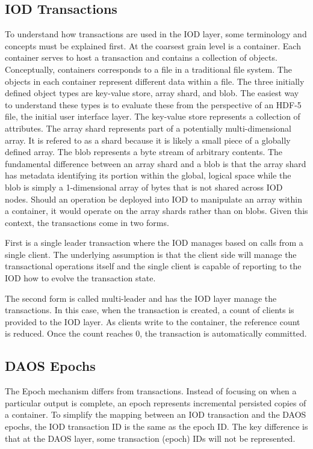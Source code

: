 \documentclass[conference]{sig-alt-gov2}
\begin{document}
\subsection{IOD Transactions}
To understand how transactions are used in the IOD layer, some terminology and
concepts must be explained first. At the coarsest grain level is a container.
Each container serves to host a transaction and contains a collection of
objects. Conceptually, containers corresponds to a file in a traditional file
system. The objects in each container represent different data within a file.
The three initially defined object types are key-value store, array shard,
and blob. The easiest way to understand these types is to evaluate these from
the perspective of an HDF-5 file, the initial user interface layer. The
key-value store represents a collection of attributes. The array shard
represents part of a potentially multi-dimensional array. It is refered to as a
shard because it is likely a small piece of a globally defined array. The blob
represents a byte stream of arbitrary contents.  The fundamental difference
between an array shard and a blob is that the array shard has metadata
identifying its portion within the global, logical space while the blob is
simply a 1-dimensional array of bytes that is not shared across IOD nodes.
Should an operation be deployed into IOD to manipulate an array within a
container, it would operate on the array shards rather than on blobs. Given
this context, the transactions come in two forms.

First is a single leader transaction where the IOD manages based on calls from
a single client. The underlying assumption is that the client side will manage
the transactional operations itself and the single client is capable of
reporting to the IOD how to evolve the transaction state. 

The second form is called multi-leader and has the IOD layer manage the
transactions. In this case, when the transaction is created, a count of clients
is provided to the IOD layer. As clients write to the container, the reference
count is reduced. Once the count reaches 0, the transaction is automatically
committed.

\subsection{DAOS Epochs}
The Epoch mechanism differs from transactions. Instead of focusing on when a
particular output is complete, an epoch represents incremental persisted copies
of a container. To simplify the mapping between an IOD transaction and the DAOS
epochs, the IOD transaction ID is the same as the epoch ID. The key difference
is that at the DAOS layer, some transaction (epoch) IDs will not be
represented.
\end{document}
